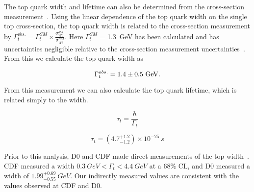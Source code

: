 The top quark width and lifetime can also be determined from the \Wtchan cross-section measurement~\cite{D0TopWidth:2010}. Using the linear dependence of the top quark width on the single top \Wtchan cross-section, the top quark width is related to the cross-section measurement by $\Gamma_{t}^{obs.} = \Gamma_{t}^{SM} \times \frac{\sigma^{obs.}_{Wt}}{\sigma^{SM}_{Wt}}$. Here $\Gamma_{t}^{SM}$ = 1.3~GeV has been calculated and has uncertainties negligible relative to the cross-section measurement uncertainties~\cite{TOPWidth:1993}. From this we calculate the top quark width as

\begin{equation}
\Gamma_{t}^{obs.} = 1.4\pm 0.5~\rm GeV.
\end{equation}

\noindent
From this measurement we can also calculate the top quark lifetime, which is related simply to the width. 

\begin{equation}
\tau_{t} = \frac{\hbar}{\Gamma_{t}}
\end{equation}

\begin{equation}
\tau_{t}=(4.7^{+1.2}_{-1.2})\times 10^{-25}~s
\end{equation}

\noindent
Prior to this analysis, D0 and CDF made direct measurements of the top width~\cite{CDF-topwidth,D0-topwidth}. CDF measured a width $0.3\ GeV < \Gamma_t < 4.4\ GeV$ at a 68\% CL, and D0 measured a width of $1.99^{+0.69}_{-0.55}\ GeV$. Our indirectly measured values are consistent with the values observed at CDF and D0.
